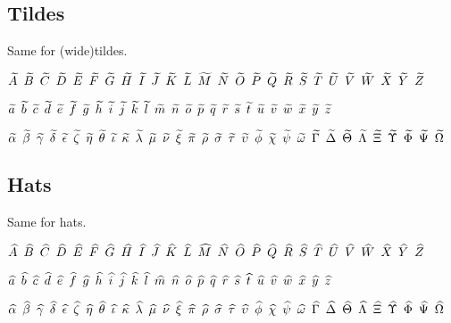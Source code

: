 \documentclass[noaddress, tikz]{nmd/article}
\begin{document}
\subsection*{Tildes} Same for (wide)tildes.

$\Atil \enskip \Btil \enskip \Ctil \enskip \Dtil \enskip \Etil \enskip \Ftil \enskip \Gtil \enskip \Htil \enskip \Itil \enskip \Jtil \enskip \Ktil \enskip \Ltil \enskip \Mtil \enskip \Ntil \enskip \Otil \enskip \Ptil \enskip \Qtil \enskip \Rtil \enskip \Stil \enskip \Ttil \enskip \Util \enskip \Vtil \enskip \Wtil \enskip \Xtil \enskip \Ytil \enskip \Ztil$

$\atil \enskip \btil \enskip \ctil \enskip \dtil \enskip \etil \enskip
\ftil \enskip \gtil \enskip \htil \enskip \itil \enskip \jtil \enskip
\ktil \enskip \ltil \enskip \mtil \enskip \ntil \enskip \otil \enskip
\ptil \enskip \qtil \enskip \rtil \enskip \stil \enskip \ttil \enskip
\util \enskip \vtil \enskip \wtil \enskip \xtil \enskip \ytil \enskip
\ztil$

$\alphatil \enskip \betatil \enskip \gammatil \enskip \deltatil
\enskip \epsilontil \enskip \zetatil \enskip \etatil \enskip \thetatil
\enskip \iotatil \enskip \kappatil \enskip \lambdatil \enskip \mutil
\enskip \nutil \enskip \xitil \enskip \pitil \enskip \rhotil \enskip
\sigmatil \enskip \tautil \enskip \upsilontil \enskip \phitil \enskip
\chitil \enskip \psitil \enskip \omegatil \enskip \Gammatil \enskip
\Deltatil \enskip \Thetatil \enskip \Lambdatil \enskip \Xitil \enskip
\Upsilontil \enskip \Phitil \enskip \Psitil \enskip \Omegatil$

\subsection*{Hats} Same for hats.

$\Ahat \enskip \Bhat \enskip \Chat \enskip \Dhat \enskip \Ehat \enskip \Fhat \enskip \Ghat \enskip \Hhat \enskip \Ihat \enskip \Jhat \enskip \Khat \enskip \Lhat \enskip \Mhat \enskip \Nhat \enskip \Ohat \enskip \Phat \enskip \Qhat \enskip \Rhat \enskip \Shat \enskip \That \enskip \Uhat \enskip \Vhat \enskip \What \enskip \Xhat \enskip \Yhat \enskip \Zhat$

$\ahat \enskip \bhat \enskip \chat \enskip \dhat \enskip \ehat \enskip
\fhat \enskip \ghat \enskip \hhat \enskip \ihat \enskip \jhat \enskip
\khat \enskip \lhat \enskip \mhat \enskip \nhat \enskip \ohat \enskip
\phat \enskip \qhat \enskip \rhat \enskip \shat \enskip \that \enskip
\uhat \enskip \vhat \enskip \what \enskip \xhat \enskip \yhat \enskip
\zhat$

$\alphahat \enskip \betahat \enskip \gammahat \enskip \deltahat \enskip \epsilonhat \enskip \zetahat \enskip \etahat \enskip \thetahat \enskip \iotahat \enskip \kappahat \enskip \lambdahat \enskip \muhat \enskip \nuhat \enskip \xihat \enskip \pihat \enskip \rhohat \enskip \sigmahat \enskip \tauhat \enskip \upsilonhat \enskip \phihat \enskip \chihat \enskip \psihat \enskip \omegahat \enskip \Gammahat \enskip \Deltahat \enskip \Thetahat \enskip \Lambdahat \enskip \Xihat \enskip \Upsilonhat \enskip \Phihat \enskip \Psihat \enskip \Omegahat$


{\RaggedRight 
 

}
\end{document}
